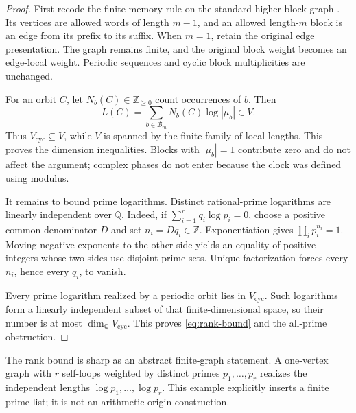 \documentclass[11pt]{article}
\theoremstyle{definition}
\theoremstyle{remark}
\newcommand{\Q}{\mathbb{Q}}
\newcommand{\Bm}{\mathcal{B}_m}
\newcommand{\Vcyc}{V_{\mathrm{cyc}}}
\begin{document}
\begin{proof}
First recode the finite-memory rule on the standard higher-block graph
\citep{lind2021symbolic}.  Its
vertices are allowed words of length \(m-1\), and an allowed length-\(m\)
block is an edge from its prefix to its suffix.  When \(m=1\), retain the
original edge presentation.  The graph remains finite, and the original
block weight becomes an edge-local weight.  Periodic sequences and cyclic
block multiplicities are unchanged.

For an orbit \(C\), let \(N_b(C)\in\mathbb Z_{\geq0}\) count occurrences of
\(b\).  Then
\[
 L(C)=\sum_{b\in\Bm}N_b(C)\log|\mu_b|\in V.
\]
Thus \(\Vcyc\subseteq V\), while \(V\) is spanned by the finite family of
local lengths.  This proves the dimension inequalities.  Blocks with
\(|\mu_b|=1\) contribute zero and do not affect the argument; complex phases
do not enter because the clock was defined using modulus.

It remains to bound prime logarithms.  Distinct rational-prime logarithms are
linearly independent over \(\Q\).  Indeed, if
\(\sum_{i=1}^{r}q_i\log p_i=0\), choose a positive common denominator \(D\)
and set \(n_i=Dq_i\in\mathbb Z\).  Exponentiation gives
\(\prod_i p_i^{n_i}=1\).  Moving negative exponents to the other side yields
an equality of positive integers whose two sides use disjoint prime sets.
Unique factorization forces every \(n_i\), hence every \(q_i\), to vanish.

Every prime logarithm realized by a periodic orbit lies in \(\Vcyc\).  Such
logarithms form a linearly independent subset of that finite-dimensional
space, so their number is at most \(\dim_{\Q}\Vcyc\).  This proves
\eqref{eq:rank-bound} and the all-prime obstruction.
\end{proof}

The rank bound is sharp as an abstract finite-graph statement.  A one-vertex
graph with \(r\) self-loops weighted by distinct primes
\(p_1,\ldots,p_r\) realizes the independent lengths
\(\log p_1,\ldots,\log p_r\).  This example explicitly inserts a finite prime
list; it is not an arithmetic-origin construction.
\end{document}
